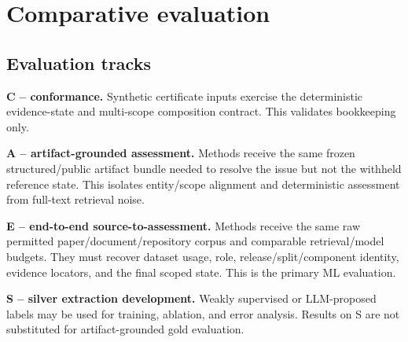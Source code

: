 \documentclass[11pt,a4paper]{article}
\begin{document}
\section{Comparative evaluation}
\label{sec:evaluation}
\subsection{Evaluation tracks}
\textbf{C -- conformance.} Synthetic certificate inputs exercise the deterministic evidence-state and multi-scope composition contract. This validates bookkeeping only.

\textbf{A -- artifact-grounded assessment.} Methods receive the same frozen structured/public artifact bundle needed to resolve the issue but not the withheld reference state. This isolates entity/scope alignment and deterministic assessment from full-text retrieval noise.

\textbf{E -- end-to-end source-to-assessment.} Methods receive the same raw permitted paper/document/repository corpus and comparable retrieval/model budgets. They must recover dataset usage, role, release/split/component identity, evidence locators, and the final scoped state. This is the primary ML evaluation.

\textbf{S -- silver extraction development.} Weakly supervised or LLM-proposed labels may be used for training, ablation, and error analysis. Results on S are not substituted for artifact-grounded gold evaluation.
\end{document}
